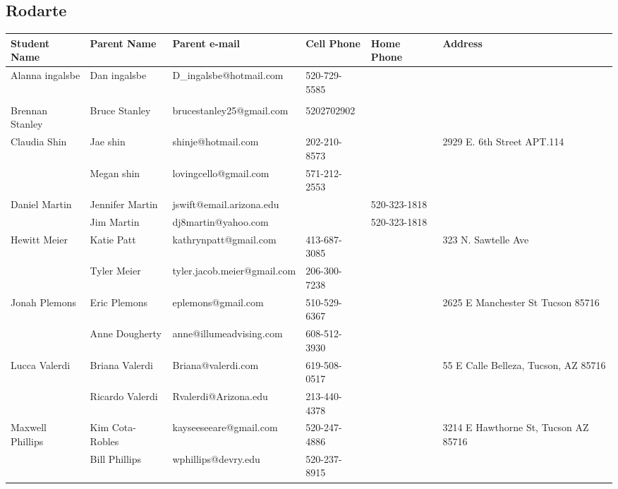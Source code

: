 \documentclass[landscape]{article}\usepackage[]{graphicx}\usepackage[]{color}
\begin{document}
\subsection{Rodarte}
\begin{longtable}{|p{100pt}|p{100pt}|p{140pt}|p{60pt}|p{64pt}|p{120pt}|}
\textbf{Student Name} & \textbf{Parent Name} & \textbf{Parent e-mail} & \textbf{Cell Phone} & \textbf{Home Phone} & \textbf{Address}\\
\hline
\hline
\multirow{2}{100pt}{Alanna ingalsbe} & Dan ingalsbe & D\_ingalsbe@hotmail.com & 520-729-5585 &  & \multirow{2}{120pt}{} \\
 &  &  &  &  & \\
\hline
\multirow{2}{100pt}{Brennan Stanley} & Bruce Stanley & brucestanley25@gmail.com & 5202702902 &  & \multirow{2}{120pt}{} \\
 &  &  &  &  & \\
\hline
\multirow{2}{100pt}{Claudia Shin} & Jae shin & shinje@hotmail.com & 202-210-8573 &  & \multirow{2}{120pt}{2929 E. 6th Street APT.114} \\
 & Megan shin & lovingcello@gmail.com & 571-212-2553 &  & \\
\hline
\multirow{2}{100pt}{Daniel Martin} & Jennifer Martin & jswift@email.arizona.edu &  & 520-323-1818 & \multirow{2}{120pt}{} \\
 & Jim Martin & dj8martin@yahoo.com &  & 520-323-1818 & \\
\hline
\multirow{2}{100pt}{Hewitt Meier} & Katie Patt & kathrynpatt@gmail.com & 413-687-3085 &  & \multirow{2}{120pt}{323 N. Sawtelle Ave} \\
 & Tyler Meier & tyler.jacob.meier@gmail.com & 206-300-7238 &  & \\
\hline
\multirow{2}{100pt}{Jonah Plemons} & Eric Plemons & eplemons@gmail.com & 510-529-6367 &  & \multirow{2}{120pt}{2625 E Manchester St Tucson 85716} \\
 & Anne Dougherty & anne@illumeadvising.com & 608-512-3930 &  & \\
\hline
\multirow{2}{100pt}{Lucca Valerdi} & Briana Valerdi & Briana@valerdi.com & 619-508-0517 &  & \multirow{2}{120pt}{55 E Calle Belleza, Tucson, AZ 85716} \\
 & Ricardo Valerdi & Rvalerdi@Arizona.edu & 213-440-4378 &  & \\
\hline
\multirow{2}{100pt}{Maxwell Phillips} & Kim Cota-Robles & kayseeseeare@gmail.com & 520-247-4886 &  & \multirow{2}{120pt}{3214 E Hawthorne St, Tucson AZ 85716} \\
 & Bill Phillips & wphillips@devry.edu & 520-237-8915 &  & \\

\end{longtable}
\end{document}
